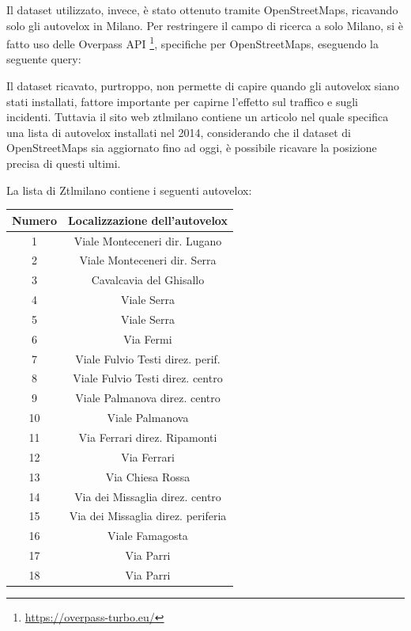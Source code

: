 \documentclass[a4paper]{report}
\begin{document}
Il dataset utilizzato, invece, è stato ottenuto tramite OpenStreetMaps, ricavando solo gli autovelox 
in Milano. 
Per restringere il campo di ricerca a solo Milano, si è fatto uso delle Overpass API
\footnote{\url{https://overpass-turbo.eu/}}, 
specifiche per OpenStreetMaps, eseguendo la seguente query: 



Il dataset ricavato, purtroppo, non permette di capire quando gli autovelox siano stati 
installati, fattore importante per capirne l'effetto sul traffico e sugli incidenti.
Tuttavia il sito web ztlmilano \cite{ZTLMILANO:1}
contiene un articolo nel quale specifica una lista di 
autovelox installati nel 2014, considerando che il dataset di OpenStreetMaps sia aggiornato 
fino ad oggi, è possibile ricavare la posizione precisa di questi ultimi.

La lista di Ztlmilano contiene i seguenti autovelox: 

\begin{center}
    \def\arraystretch{1.5}%
    \begin{tabular}{ |c|c| } 
    \hline
    Numero & Localizzazione dell'autovelox \\ 
    \hline
    \rowcolor{TableGray}
    1   &   Viale Monteceneri  dir. Lugano\\
    2   &   Viale Monteceneri dir. Serra\\
    \rowcolor{TableGray}
    3   &   Cavalcavia del Ghisallo\\
    4   &   Viale Serra \\
    \rowcolor{TableGray}
    5   &   Viale Serra\\
    6   &   Via Fermi\\
    \rowcolor{TableGray}
    7   &   Viale Fulvio Testi direz. perif.\\
    8   &   Viale Fulvio Testi direz. centro\\
    \rowcolor{TableGray}
    9   &   Viale Palmanova  direz. centro\\
    10  &   Viale Palmanova\\
    \rowcolor{TableGray}
    11  &   Via Ferrari direz. Ripamonti\\
    12  &   Via Ferrari\\
    \rowcolor{TableGray}
    13  &   Via Chiesa Rossa\\
    14  &   Via dei Missaglia direz. centro\\
    \rowcolor{TableGray}
    15  &   Via dei Missaglia direz. periferia\\
    16  &   Viale Famagosta\\
    \rowcolor{TableGray}
    17  &   Via Parri\\
    18  &   Via Parri\\
    \hline
    \end{tabular}
    \label{ztl-milano}
\end{center}
\end{document}
